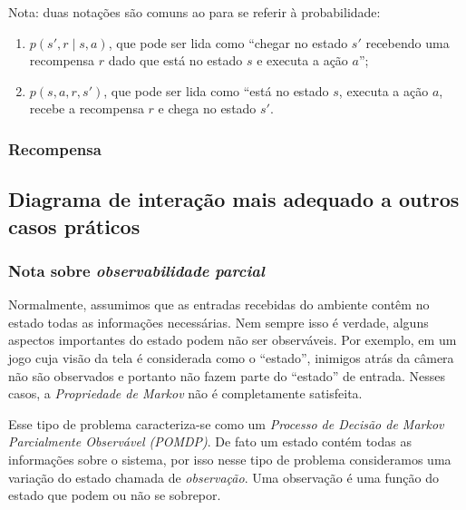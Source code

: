 \documentclass{article}
\begin{document}
                Nota: duas notações são comuns ao para se referir à probabilidade:
                
                \begin{enumerate}
                    \item $p(s', r \mid s, a)$, que pode ser lida como ``chegar no estado $s'$ recebendo uma recompensa $r$ dado que está no estado $s$ e executa a ação $a$'';
                    \item $p(s, a, r, s')$, que pode ser lida como ``está no estado $s$, executa a ação $a$, recebe a recompensa $r$ e chega no estado $s'$.
                \end{enumerate}
                
            \subsubsection{Recompensa}
        
                
        \subsection{Diagrama de interação mais adequado a outros casos práticos}
        
            \subsubsection{Nota sobre \emph{observabilidade parcial}}

                Normalmente, assumimos que as entradas recebidas do ambiente contêm no estado todas as informações necessárias. Nem sempre isso é verdade, alguns aspectos importantes do estado podem não ser observáveis. Por exemplo, em um jogo cuja visão da tela é considerada como o ``estado'', inimigos atrás da câmera não são observados e portanto não fazem parte do ``estado'' de entrada. Nesses casos, a \emph{Propriedade de Markov} não é completamente satisfeita. 
                
                Esse tipo de problema caracteriza-se como um \emph{Processo de Decisão de Markov Parcialmente Observável (POMDP)}. De fato um estado contém todas as informações sobre o sistema, por isso nesse tipo de problema consideramos uma variação do estado chamada de \emph{observação}. Uma observação é uma função do estado que podem ou não se sobrepor.
                
\end{document}
